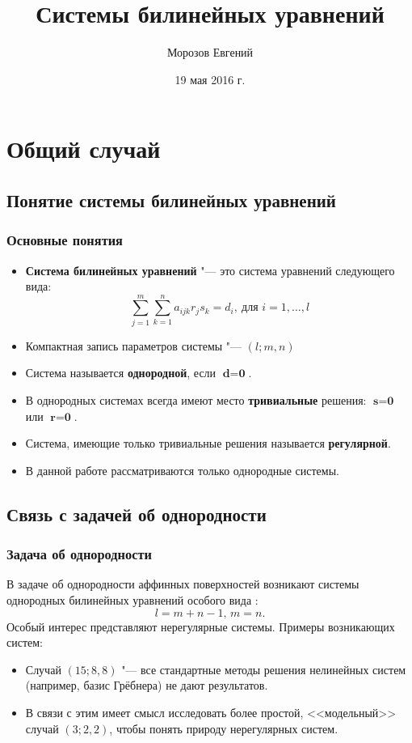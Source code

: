 \documentclass{beamer}
\title{Системы билинейных уравнений}
\institute
{
	Воронежский Государственный Университет \\
	Факультет Компьютерных Наук
}
\author{Морозов Евгений}
\date{19 мая 2016 г.}
\begin{document}
\frame{\titlepage}

\section[Outline]{}
\frame{\tableofcontents}

\section{Общий случай}
\subsection{Понятие системы билинейных уравнений}
\frame
{
  \frametitle{Основные понятия}
  
	\begin{itemize}
		\item \textbf{Система билинейных уравнений} "--- это система уравнений следующего вида:
		$$
			\sum_{j = 1}^{m} \sum_{k = 1}^{n} a_{i j k} r_j s_k = d_i,~\text{для } i = 
			1,\dots,l
		$$
		\item Компактная запись параметров системы "--- $(l; m, n)$
		\item Система называется \textbf{однородной}, если $\textbf{d} = \textbf{0}$. 
	 	\item В однородных 	системах всегда имеют место \textbf{тривиальные} решения: $\textbf{s} =  
			  \textbf{0}$ или $\textbf{r} = \textbf{0}$.
		\item Система, имеющие только тривиальные решения называется \textbf{регулярной}.
		\item В данной работе рассматриваются только однородные системы.
	\end{itemize}
}
\subsection{Связь с задачей об однородности}
\frame
{
	\frametitle{Задача об однородности}
	
	В задаче об однородности аффинных поверхностей возникают 
	системы однородных билинейных уравнений особого вида : 
	$$l = m + n - 1,\, m = n.$$ 
	Особый интерес представляют нерегулярные системы.
	Примеры возникающих систем:
	\begin{itemize}
		\item Случай $(15; 8, 8)$ "--- все стандартные методы решения нелинейных систем (например, базис Грёбнера) не дают результатов. 
		\item В связи с этим имеет смысл исследовать более простой, <<модельный>> случай $(3;2,2)$, чтобы понять природу нерегулярных систем.
	\end{itemize}
}
\end{document}

